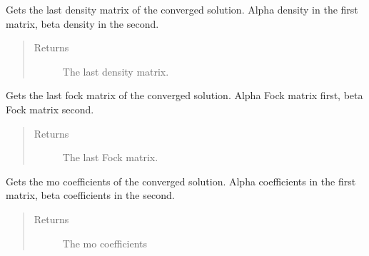 \documentclass[letterpaper,10pt,english]{sphinxmanual}
\begin{document}
\begin{fulllineitems}

\begin{fulllineitems}
\label{\detokenize{UHF:ghf.UHF.UHF.get_last_dens}}
Gets the last density matrix of the converged solution.
Alpha density in the first matrix, beta density in the second.
\begin{quote}\begin{description}
\item[{Returns}] \leavevmode
The last density matrix.

\end{description}\end{quote}

\end{fulllineitems}


\begin{fulllineitems}
\label{\detokenize{UHF:ghf.UHF.UHF.get_last_fock}}
Gets the last fock matrix of the converged solution.
Alpha Fock matrix first, beta Fock matrix second.
\begin{quote}\begin{description}
\item[{Returns}] \leavevmode
The last Fock matrix.

\end{description}\end{quote}

\end{fulllineitems}


\begin{fulllineitems}
\label{\detokenize{UHF:ghf.UHF.UHF.get_mo_coeff}}
Gets the mo coefficients of the converged solution.
Alpha coefficients in the first matrix, beta coefficients in the second.
\begin{quote}\begin{description}
\item[{Returns}] \leavevmode
The mo coefficients


\end{description}
\end{quote}
\end{fulllineitems}
\end{fulllineitems}
\end{document}
